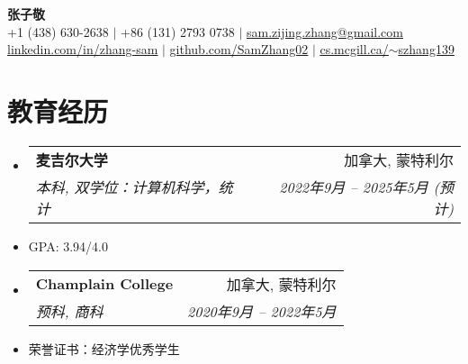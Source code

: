 \documentclass[letterpaper,11pt]{article}
\makeatletter
\newcommand{\resumeItem}[1]{
  \item\small{
    {#1 \vspace{-2pt}}
  }
}
\newcommand{\resumeSubheading}[4]{
  \vspace{-2pt}\item
  \begin{tabular*}{0.97\textwidth}[t]{l@{\extracolsep{\fill}}r}
    \textbf{#1} & #2 \\
    \textit{\small#3} & \textit{\small #4} \\
  \end{tabular*}\vspace{-7pt}
}
\newcommand{\resumeSubHeadingListStart}{\begin{itemize}[leftmargin=0.15in, label={}]}
\newcommand{\resumeSubHeadingListEnd}{\end{itemize}}
\newcommand{\resumeItemListStart}{\begin{itemize}}
\newcommand{\resumeItemListEnd}{\end{itemize}\vspace{-5pt}}
\makeatother
\begin{document}
\begin{CJK*}{UTF8}{gbsn}


  \begin{center}
    \textbf{\Huge \scshape 张子敬} \\ \vspace{1pt}
    \small +1 (438) 630-2638 $|$ +86 (131) 2793 0738 $|$ \href{mailto:sam.zijing.zhang@gmail.com}{\underline{sam.zijing.zhang@gmail.com}}  \\
    \href{https://linkedin.com/in/zhang-sam}{\underline{linkedin.com/in/zhang-sam}} $|$
    \href{https://github.com/SamZhang02}{\underline{github.com/SamZhang02}} $|$
    \href{https://cs.mcgill.ca/~szhang139}{\underline{cs.mcgill.ca/$\sim$szhang139}}
  \end{center}

  \section{教育经历}
  \resumeSubHeadingListStart
  \resumeSubheading
  {麦吉尔大学}{加拿大, 蒙特利尔}
  {本科, 双学位：计算机科学，统计}{2022年9月 -- 2025年5月 (预计)}
  \resumeItem{GPA: 3.94/4.0}
  \resumeSubheading
  {Champlain College}{加拿大, 蒙特利尔}
  {预科, 商科}{2020年9月 -- 2022年5月}
  \resumeItem{荣誉证书：经济学优秀学生}
  \resumeSubHeadingListEnd




\end{CJK*}
\end{document}
